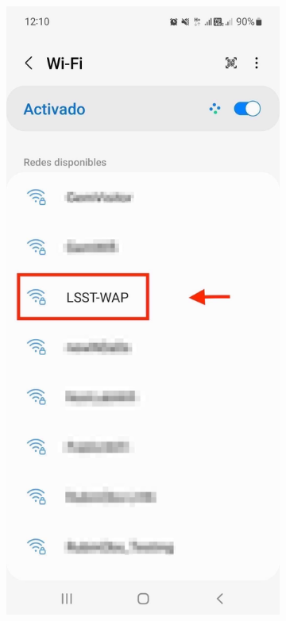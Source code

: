   \begin{figure}
    \centering
    \begin{subfigure}{0.4\textwidth}
      \includegraphics[width=\textwidth]{Images/Android1.png}

\end{subfigure}
\end{figure}
